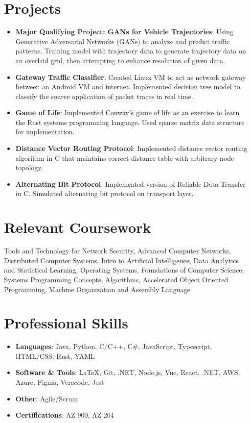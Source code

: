 \documentclass[letterpaper,11pt]{article}
\newcommand{\resumeItem}[2]{
  \item\small{
    \textbf{#1}{: #2 \vspace{-2pt}}
  }
}
\newcommand{\resumeSubItem}[2]{\resumeItem{#1}{#2}\vspace{-4pt}}
\newcommand{\resumeSubHeadingListStart}{\begin{itemize}[leftmargin=*]}
\newcommand{\resumeSubHeadingListEnd}{\end{itemize}}
\begin{document}
\section{Projects}
  \resumeSubHeadingListStart
  \resumeSubItem{Major Qualifying Project: GANs for Vehicle Trajectories}
      {Using Generative Adversarial Networks (GANs) to analyze and predict traffic patterns. Training model with trajectory data to generate trajectory data on an overlaid grid, then attempting to enhance resolution of given data.}
    \resumeSubItem{Gateway Traffic Classifier}
      {Created Linux VM to act as network gateway between an Android VM and internet. Implemented decision tree model to classify the source application of packet traces in real time.}
      \resumeSubItem{Game of Life}
      {Implemented Conway's game of life as an exercise to learn the Rust systems programming language. Used sparse matrix data structure for implementation.}
    \resumeSubItem{Distance Vector Routing Protocol}
      {Implemented distance vector routing algorithm in C that maintains correct distance table with arbitrary node topology.}
    \resumeSubItem{Alternating Bit Protocol}
      {Implemented version of Reliable Data Transfer in C. Simulated alternating bit protocol on transport layer.}
  \resumeSubHeadingListEnd
  
\section{Relevant Coursework}
  Tools and Technology for Network Security, Advanced Computer Networks, Distributed Computer Systems, Intro to Artificial Intelligence, Data Analytics and Statistical Learning, Operating Systems, Foundations of Computer Science, Systems Programming Concepts, Algorithms, Accelerated Object Oriented Programming, Machine Organization and Assembly Language

\section{Professional Skills}
 \resumeSubHeadingListStart
    \item{
     \textbf{Languages}{: Java, Python, C/C++, C\#, JavaScript, Typescript, HTML/CSS, Rust, YAML }
     }
     \item{
     \textbf{Software \& Tools}{: \LaTeX, Git, .NET, Node.js, Vue, React, .NET, AWS, Azure, Figma, Veracode, Jest}
    }
    \item{
     \textbf{Other}{: Agile/Scrum}
    }
    \item{
     \textbf{Certifications}{: AZ 900, AZ 204}
    }
 \resumeSubHeadingListEnd

\end{document}
